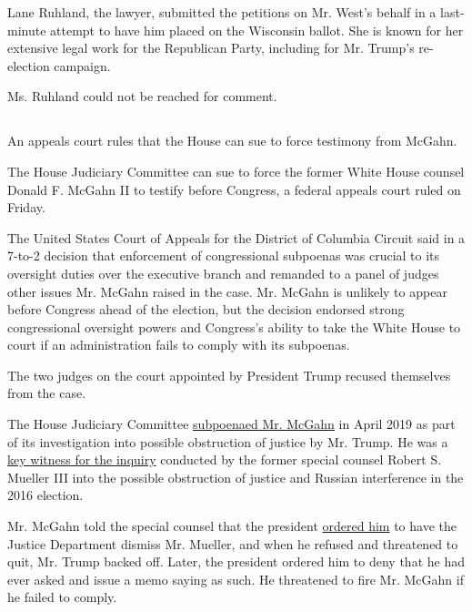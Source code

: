 Lane Ruhland, the lawyer, submitted the petitions on Mr. West's behalf
in a last-minute attempt to have him placed on the Wisconsin ballot. She
is known for her extensive legal work for the Republican Party,
including for Mr. Trump's re-election campaign.

Ms. Ruhland could not be reached for comment.

\hypertarget{-6}{%
\subsection{}\label{-6}}

An appeals court rules that the House can sue to force testimony from
McGahn.

The House Judiciary Committee can sue to force the former White House
counsel Donald F. McGahn II to testify before Congress, a federal
appeals court ruled on Friday.

The United States Court of Appeals for the District of Columbia Circuit
said in a 7-to-2 decision that enforcement of congressional subpoenas
was crucial to its oversight duties over the executive branch and
remanded to a panel of judges other issues Mr. McGahn raised in the
case. Mr. McGahn is unlikely to appear before Congress ahead of the
election, but the decision endorsed strong congressional oversight
powers and Congress's ability to take the White House to court if an
administration fails to comply with its subpoenas.

The two judges on the court appointed by President Trump recused
themselves from the case.

The House Judiciary Committee
\href{https://www.nytimes3xbfgragh.onion/2019/04/22/us/politics/mcgahn-trump-attacks.html}{subpoenaed
Mr. McGahn} in April 2019 as part of its investigation into possible
obstruction of justice by Mr. Trump. He was a
\href{https://www.nytimes3xbfgragh.onion/interactive/2019/04/19/us/politics/mueller-report-citations.html}{key
witness for the inquiry} conducted by the former special counsel Robert
S. Mueller III into the possible obstruction of justice and Russian
interference in the 2016 election.

Mr. McGahn told the special counsel that the president
\href{https://www.nytimes3xbfgragh.onion/2018/01/25/us/politics/trump-mueller-special-counsel-russia.html}{ordered
him} to have the Justice Department dismiss Mr. Mueller, and when he
refused and threatened to quit, Mr. Trump backed off. Later, the
president ordered him to deny that he had ever asked and issue a memo
saying as such. He threatened to fire Mr. McGahn if he failed to comply.

